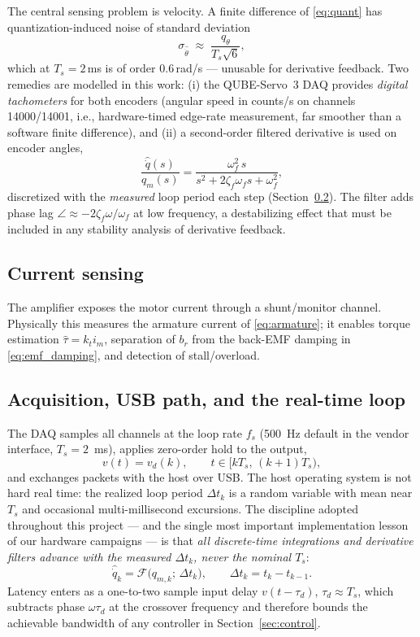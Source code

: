 \documentclass[conference]{IEEEtran}
\begin{document}
The central sensing problem is velocity. A finite difference of \eqref{eq:quant} has quantization-induced noise of standard deviation
\begin{equation}
\sigma_{\hat{\dot\theta}} \;\approx\; \frac{q_\theta}{T_s\sqrt{6}},
\end{equation}
which at $T_s=2\,$ms is of order $0.6\,$rad/s --- unusable for derivative feedback. Two remedies are modelled in this work: (i) the QUBE-Servo~3 DAQ provides \emph{digital tachometers} for both encoders (angular speed in counts/s on channels 14000/14001, i.e., hardware-timed edge-rate measurement, far smoother than a software finite difference), and (ii) a second-order filtered derivative is used on encoder angles,
\begin{equation}
\frac{\hat{\dot q}(s)}{q_m(s)} = \frac{\omega_f^2\, s}{s^2 + 2\zeta_f\omega_f s + \omega_f^2},
\label{eq:filtder}
\end{equation}
discretized with the \emph{measured} loop period each step (Section~\ref{sec:rt}). The filter adds phase lag $\angle \approx -2\zeta_f\omega/\omega_f$ at low frequency, a destabilizing effect that must be included in any stability analysis of derivative feedback.

\subsection{Current sensing}
The amplifier exposes the motor current through a shunt/monitor channel. Physically this measures the armature current of \eqref{eq:armature}; it enables torque estimation $\hat\tau = k_t i_m$, separation of $b_r$ from the back-EMF damping in \eqref{eq:emf_damping}, and detection of stall/overload.

\subsection{Acquisition, USB path, and the real-time loop}\label{sec:rt}
The DAQ samples all channels at the loop rate $f_s$ (500~Hz default in the vendor interface, $T_s = 2$~ms), applies zero-order hold to the output,
\begin{equation}
v(t) = v_d(k), \qquad t\in[kT_s,\,(k{+}1)T_s),
\end{equation}
and exchanges packets with the host over USB. The host operating system is not hard real time: the realized loop period $\Delta t_k$ is a random variable with mean near $T_s$ and occasional multi-millisecond excursions. The discipline adopted throughout this project --- and the single most important implementation lesson of our hardware campaigns --- is that \emph{all discrete-time integrations and derivative filters advance with the measured $\Delta t_k$, never the nominal $T_s$}:
\begin{equation}
\hat{\dot q}_{k} = \mathcal{F}\bigl(q_{m,k};\,\Delta t_k\bigr),\qquad \Delta t_k = t_k - t_{k-1}.
\label{eq:measured_dt}
\end{equation}
Latency enters as a one-to-two sample input delay $v(t-\tau_d)$, $\tau_d\!\approx\!T_s$, which subtracts phase $\omega\tau_d$ at the crossover frequency and therefore bounds the achievable bandwidth of any controller in Section~\ref{sec:control}.
\end{document}
